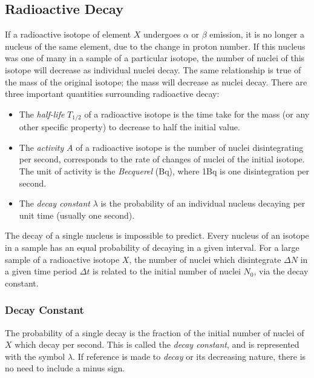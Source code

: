 \documentclass[12pt]{article}
\begin{document}
\subsection{Radioactive Decay}
\label{sec:org1d75ee8}

If a radioactive isotope of element \(X\) undergoes \(\alpha\) or \(\beta\) emission, it is no longer a nucleus of the same element, due to the change in proton number. If this nucleus was one of many in a sample of a particular isotope, the number of nuclei of this isotope will decrease as individual nuclei decay. The same relationship is true of the mass of the original isotope; the mass will decrease as nuclei decay. There are three important quantities surrounding radioactive decay:

\begin{itemize}
\item The \emph{half-life} \(T_{1/2}\) of a radioactive isotope is the time take for the mass (or any other specific property) to decrease to half the initial value.

\item The \emph{activity} \(A\) of a radioactive isotope is the number of nuclei disintegrating per second, corresponds to the rate of changes of nuclei of the initial isotope. The unit of activity is the \emph{Becquerel} (Bq), where 1Bq is one disintegration per second.

\item The \emph{decay constant} \(\lambda\) is the probability of an individual nucleus decaying per unit time (usually one second).
\end{itemize}

The decay of a single nucleus is impossible to predict. Every nucleus of an isotope in a sample has an equal probability of decaying in a given interval. For a large sample of a radioactive isotope \(X\), the number of nuclei which disintegrate \(\Delta N\) in a given time period \(\Delta t\) is related to the initial number of nuclei \(N_0\), via the decay constant.

\subsubsection{Decay Constant}
\label{sec:orgdb25eff}

The probability of a single decay is the fraction of the initial number of nuclei of \(X\) which decay per second. This is called the \emph{decay constant}, and is represented with the symbol \(\lambda\). If reference is made to \emph{decay} or its decreasing nature, there is no need to include a minus sign.
\end{document}
